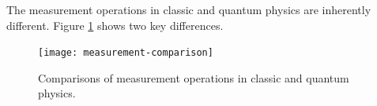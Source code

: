 \documentclass{easyclass}
\begin{document}
The measurement operations in classic and quantum physics are inherently different. Figure \ref{fig:measurement-comparison} shows two key differences.

\begin{figure}[h]
	\centering
	\texttt{[image: measurement-comparison]}
	\caption{Comparisons of measurement operations in classic and quantum physics.}
	\label{fig:measurement-comparison}
\end{figure}
\end{document}
